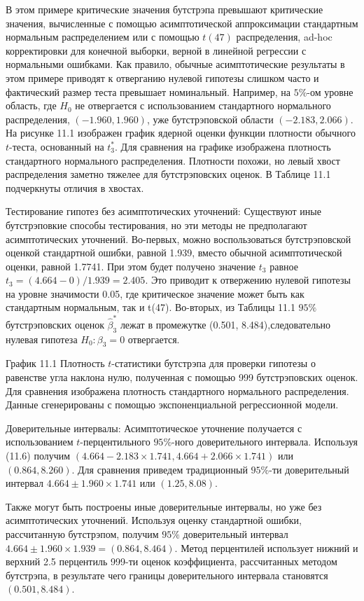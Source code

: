 В этом примере критические значения бутстрэпа превышают критические значения, вычисленные с помощью асимптотической аппроксимации стандартным нормальным распределением или с помощью $t(47)$ распределения, ad-hoc корректировки для конечной выборки, верной в линейной регрессии с нормальными ошибками. Как правило, обычные асимптотические результаты в этом примере приводят к отверганию нулевой гипотезы слишком часто и фактический размер теста превышает номинальный. Например, на $5\%$-ом уровне область, где $H_0$ не отвергается с использованием стандартного нормального распределения, $(-1.960, 1.960)$, уже бутстрэповской области $(-2.183, 2.066)$. На рисунке 11.1 изображен график ядерной оценки функции плотности обычного $t$-теста, основанный на $t_3^*$. Для сравнения на графике изображена плотность стандартного нормального распределения. Плотности похожи, но левый хвост распределения заметно тяжелее для бутстрэповских оценок. В Таблице 11.1 подчеркнуты отличия в хвостах.

Тестирование гипотез без асимптотических уточнений: Существуют иные бутстрэповкие способы тестирования, но эти методы не предполагают асимптотических уточнений. Во-первых, можно воспользоваться бутстрэповской оценкой стандартной ошибки, равной 1.939, вместо обычной асимптотической оценки, равной 1.7741. При этом  будет получено значение $t_3$ равное $t_3=(4.664-0)/1.939=2.405$. Это приводит к отвержению нулевой гипотезы на уровне значимости 0.05, где критическое значение может быть как стандартным нормальным, так и t(47). Во-вторых, из Таблицы 11.1 $95\%$ бутстрэповских оценок $\hat{\beta}_3^*$ лежат в промежутке (0.501, 8.484),следовательно нулевая гипотеза $H_0:\beta_3=0$ отвергается.

\vspace{3cm}

График 11.1 Плотность $t$-статистики бутстрэпа для проверки гипотезы о равенстве угла наклона нулю,  полученная с помощью 999 бутстрэповских оценок. Для сравнения изображена плотность стандартного нормального распределения. Данные сгенерированы с помощью экспоненциальной регрессионной модели.


Доверительные интервалы: Асимптотическое уточнение получается с использованием $t$-перцентильного $95\%$-ного
доверительного интервала. Используя (11.6) получим  $(4.664-2.183 \times 1.741,4.664+2.066 \times 1.741)$ или $(0.864,8.260)$. Для  сравнения приведем традиционный $95\%$-ти доверительный интервал $4.664 \pm 1.960 \times 1.741$ или $(1.25, 8.08)$.

Также могут быть построены иные доверительные интервалы, но уже без асимптотических уточнений. Используя оценку стандартной ошибки, рассчитанную бутстрэпом, получим $95\%$ доверительный интервал $4.664 \pm 1.960 \times 1.939=(0.864,8.464)$. Метод перцентилей использует нижний и верхний 2.5 перцентиль 999-ти оценок коэффициента, рассчитанных методом бутстрэпа, в результате чего границы доверительного интервала становятся $(0.501,8.484)$.
 

